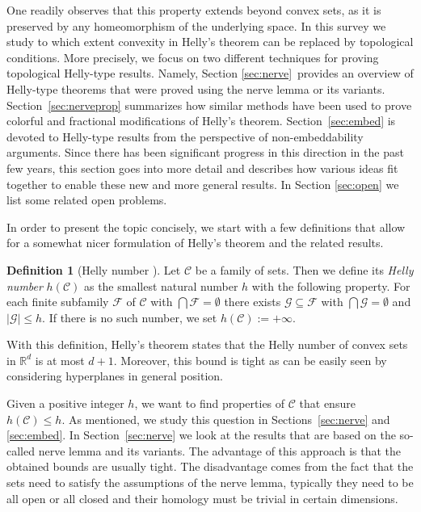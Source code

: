 \documentclass[a4paper,12pt]{amsart}
\newcommand{\R}{\mathbb{R}} 	%
\theoremstyle{definition}
\newtheorem{definition}[theorem]{Definition}
\begin{document}
One readily observes that this property extends beyond convex sets, as it is preserved by any homeomorphism of the underlying space.
In this survey we study to which extent convexity in Helly's theorem can be replaced by topological conditions. 
More precisely, we focus on two different techniques for proving topological Helly-type results. Namely, Section \ref{sec:nerve}~provides an overview of Helly-type theorems that were proved using the nerve lemma or its variants. Section~\ref{sec:nerveprop} summarizes how similar methods have been used to prove colorful and fractional modifications of Helly's theorem. 
Section~\ref{sec:embed} is devoted to Helly-type results from the perspective of non-embeddability arguments. Since there has been significant progress in this direction in the past few years, this section goes into more detail and describes how various ideas fit together to enable these new and more general results. In Section \ref{sec:open} we list some related open problems.

\medskip

In order to present the topic concisely, we start with a few definitions that allow for a somewhat nicer formulation of Helly's theorem and the related results. 
\begin{definition}[Helly number \cite{Danzer_Grunbaum_Klee_Helly_number}]
Let $\mathcal C$ be a family of sets.
Then we define its \emph{Helly number} $h(\mathcal C)$ as the smallest natural number $h$ with the following property.
For each finite subfamily $\mathcal F$ of $\mathcal C$ with $\bigcap \mathcal F=\emptyset$ there exists $\mathcal G\subseteq\mathcal F$ with $\bigcap \mathcal G=\emptyset$ and $|\mathcal G|\leq h$.
If there is no such number, we set $h(\mathcal C):=+\infty$.
\end{definition}
With this definition, Helly's theorem states that the Helly number of convex sets in $\R^d$ is at most $d+1$. Moreover, this bound is tight as can be easily seen by considering hyperplanes in general position.

Given a positive integer $h$,
we want to find properties of $\mathcal C$ that ensure $h(\mathcal C)\leq h$.
As mentioned, we study this question in Sections~\ref{sec:nerve} and \ref{sec:embed}.
In Section~\ref{sec:nerve} we look at the results that are based on the so-called nerve lemma and its variants. The advantage of this approach is that the obtained bounds are usually tight. The disadvantage comes from the fact that the sets need to satisfy the assumptions of the nerve lemma, typically they need to be all open or all closed and their homology must be trivial in certain dimensions.
\end{document}
